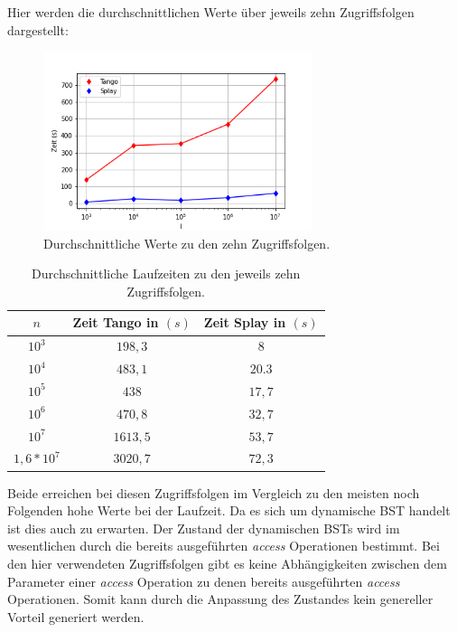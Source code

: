 \documentclass[a4paper,12pt]{article}
\begin{document}
\noindent Hier werden die durchschnittlichen Werte über jeweils zehn Zugriffsfolgen dargestellt:
\begin{figure}[H]
	\centering
	\includegraphics[width=0.7\textwidth]{Medien/laufzeittest/diagramm/randomaccess}
	\caption{Durchschnittliche Werte zu den zehn Zugriffsfolgen.}
	
\end{figure}
\begin{table}[H]
	\begin{center}
		\begin{tabular}[c]{|c|c|c|}
			\hline
			$n$ & Zeit Tango in $\left(s\right)$ &Zeit Splay in $\left(s\right)$ \\
			\hline
			$10^3$ & $198,3$ &$8$ \\
			\hline
			$10^4$  & $483,1$ &$20.3$  \\
			\hline
			$10^5$  & $438$ &$17,7$  \\
			\hline
			$10^6$  & $470,8$ &$32,7$  \\
			\hline
			$10^7$  & $1613,5$ &$53,7$  \\
			\hline
			$1,6 * 10^7$  & $3020,7$ &$72,3$  \\
			\hline
		\end{tabular}
		\caption{Durchschnittliche Laufzeiten zu den jeweils zehn Zugriffsfolgen.} 
	\end{center}
\end{table}
\noindent Beide erreichen bei diesen Zugriffsfolgen im Vergleich zu den meisten noch Folgenden hohe Werte bei der Laufzeit. Da es sich um dynamische BST handelt ist dies auch zu erwarten. Der Zustand der dynamischen BSTs wird im wesentlichen durch  die  bereits ausgeführten \textit{access} Operationen bestimmt. Bei den hier verwendeten Zugriffsfolgen gibt es keine Abhängigkeiten zwischen dem Parameter einer \textit{access} Operation zu denen bereits ausgeführten \textit{access} Operationen. Somit kann durch die Anpassung des Zustandes kein genereller Vorteil generiert werden.\\
\end{document}
